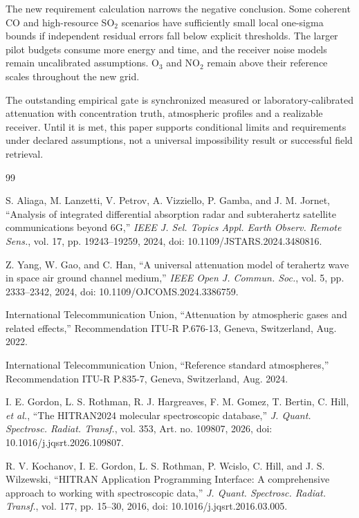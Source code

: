\documentclass[conference]{IEEEtran}
\begin{document}
The new requirement calculation narrows the negative conclusion. Some coherent CO and high-resource SO$_2$ scenarios have sufficiently small local one-sigma bounds if independent residual errors fall below explicit thresholds. The larger pilot budgets consume more energy and time, and the receiver noise models remain uncalibrated assumptions. O$_3$ and NO$_2$ remain above their reference scales throughout the new grid.

The outstanding empirical gate is synchronized measured or laboratory-calibrated attenuation with concentration truth, atmospheric profiles and a realizable receiver. Until it is met, this paper supports conditional limits and requirements under declared assumptions, not a universal impossibility result or successful field retrieval.

\begin{thebibliography}{99}

S. Aliaga, M. Lanzetti, V. Petrov, A. Vizziello, P. Gamba, and J. M. Jornet, ``Analysis of integrated differential absorption radar and subterahertz satellite communications beyond 6G,'' \emph{IEEE J. Sel. Topics Appl. Earth Observ. Remote Sens.}, vol. 17, pp. 19243--19259, 2024, doi: 10.1109/JSTARS.2024.3480816.

Z. Yang, W. Gao, and C. Han, ``A universal attenuation model of terahertz wave in space air ground channel medium,'' \emph{IEEE Open J. Commun. Soc.}, vol. 5, pp. 2333--2342, 2024, doi: 10.1109/OJCOMS.2024.3386759.

International Telecommunication Union, ``Attenuation by atmospheric gases and related effects,'' Recommendation ITU-R P.676-13, Geneva, Switzerland, Aug. 2022.

International Telecommunication Union, ``Reference standard atmospheres,'' Recommendation ITU-R P.835-7, Geneva, Switzerland, Aug. 2024.

I. E. Gordon, L. S. Rothman, R. J. Hargreaves, F. M. Gomez, T. Bertin, C. Hill, \emph{et al.}, ``The HITRAN2024 molecular spectroscopic database,'' \emph{J. Quant. Spectrosc. Radiat. Transf.}, vol. 353, Art. no. 109807, 2026, doi: 10.1016/j.jqsrt.2026.109807.

R. V. Kochanov, I. E. Gordon, L. S. Rothman, P. Wcislo, C. Hill, and J. S. Wilzewski, ``HITRAN Application Programming Interface: A comprehensive approach to working with spectroscopic data,'' \emph{J. Quant. Spectrosc. Radiat. Transf.}, vol. 177, pp. 15--30, 2016, doi: 10.1016/j.jqsrt.2016.03.005.


\end{thebibliography}
\end{document}
